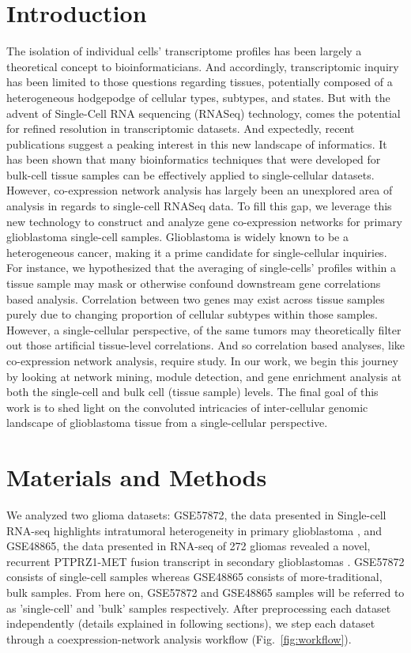 \documentclass[10pt,letterpaper]{article}
\begin{document}
\section*{Introduction}
The isolation of individual cells’ transcriptome profiles has been largely a theoretical concept to bioinformaticians. And accordingly, transcriptomic inquiry has been limited to those questions regarding tissues, potentially composed of a heterogeneous hodgepodge of cellular types, subtypes, and states. But with the advent of Single-Cell RNA sequencing (RNASeq) technology, comes the potential for refined resolution in transcriptomic datasets. And expectedly, recent publications suggest a peaking interest in this new landscape of informatics. It has been shown that many bioinformatics techniques that were developed for bulk-cell tissue samples can be effectively applied to single-cellular datasets. %
However, co-expression network analysis has largely been an unexplored area of analysis in regards to single-cell RNASeq data. To fill this gap, we leverage this new technology to construct and analyze gene co-expression networks for primary glioblastoma single-cell samples. Glioblastoma is widely known to be a heterogeneous cancer, making it a prime candidate for single-cellular inquiries. For instance, we hypothesized that the averaging of single-cells’ profiles within a tissue sample may mask or otherwise confound downstream gene correlations based analysis. Correlation between two genes may exist across tissue samples purely due to changing proportion of cellular subtypes within those samples. However, a single-cellular perspective, of the same tumors may theoretically filter out those artificial tissue-level correlations. And so correlation based analyses, like co-expression network analysis, require study. In our work, we begin this journey by looking at network mining, module detection, and gene enrichment analysis at both the single-cell and bulk cell (tissue sample) levels. The final goal of this work is to shed light on the convoluted intricacies of inter-cellular genomic landscape of glioblastoma tissue from a single-cellular perspective.

\section*{Materials and Methods}
We analyzed two glioma datasets: GSE57872, the data presented in Single-cell RNA-seq highlights intratumoral heterogeneity in primary glioblastoma \cite{Patel20062014}, and GSE48865, the data presented in RNA-seq of 272 gliomas revealed a novel, recurrent PTPRZ1-MET fusion transcript in secondary glioblastomas \cite{Bao2014}. GSE57872 consists of single-cell samples whereas GSE48865 consists of more-traditional, bulk samples. From here on, GSE57872 and GSE48865 samples will be referred to as 'single-cell' and 'bulk' samples respectively. After preprocessing each dataset independently (details explained in following sections), we step each dataset through a coexpression-network analysis workflow (Fig.~\ref{fig:workflow}).
\end{document}
